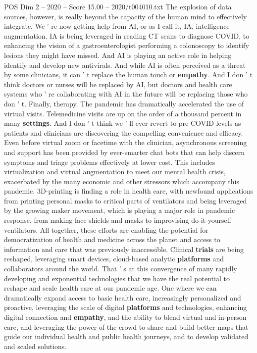 \begin{textsample}{POS Dim 2 – 2020 – Score 15.00 – 2020/t004010.txt}
The explosion of data sources, however, is really beyond the capacity of the human mind to effectively integrate.
We ' re now getting help from AI, or as I call it, IA, intelligence augmentation.
IA is being leveraged in reading CT scans to diagnose COVID, to enhancing the vision of a gastroenterologist performing a colonoscopy to identify lesions they might have missed.
And AI is playing an active role in helping identify and develop new antivirals.
And while AI is often perceived as a threat by some clinicians, it can ' t replace the human touch or \textbf{empathy}.
And I don ' t think doctors or nurses will be replaced by AI, but doctors and health care systems who ' re collaborating with AI in the future will be replacing those who don ' t.
Finally, therapy.
The pandemic has dramatically accelerated the use of virtual visits.
Telemedicine visits are up on the order of a thousand percent in many \textbf{settings}.
And I don ' t think we ' ll ever revert to pre-COVID levels as patients and clinicians are discovering the compelling convenience and efficacy.
Even before virtual zoom or facetime with the clinician, asynchronous screening and support has been provided by ever-smarter chat bots that can help discern symptoms and triage problems effectively at lower cost.
This includes virtualization and virtual augmentation to meet our mental health crisis, exacerbated by the many economic and other stressors which accompany this pandemic. 3D-printing is finding a role in health care, with newfound applications from printing personal masks to critical parts of ventilators and being leveraged by the growing maker movement, which is playing a major role in pandemic response, from making face shields and masks to improvising do-it-yourself ventilators.
All together, these efforts are enabling the potential for democratization of health and medicine across the planet and access to information and care that was previously inaccessible.
Clinical \textbf{trials} are being reshaped, leveraging smart devices, cloud-based analytic \textbf{platforms} and collaborators around the world.
That ' s at this convergence of many rapidly developing and exponential technologies that we have the real potential to reshape and scale health care at our pandemic age.
One where we can dramatically expand access to basic health care, increasingly personalized and proactive, leveraging the scale of digital \textbf{platforms} and technologies, enhancing digital connection and \textbf{empathy}, and the ability to blend virtual and in-person care, and leveraging the power of the crowd to share and build better maps that guide our individual health and public health journeys, and to develop validated and scaled solutions.

\end{textsample}

